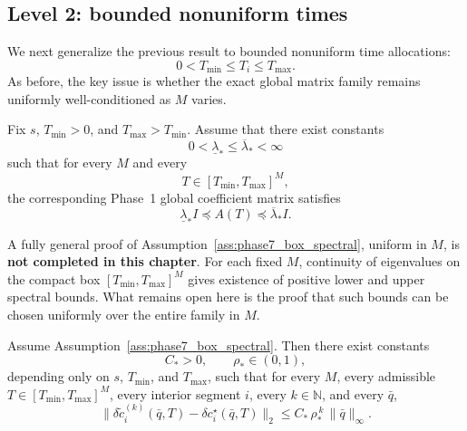 \subsection{Level 2: bounded nonuniform times}
\label{subsec:phase7_bounded_nonuniform}

We next generalize the previous result to bounded nonuniform time allocations:
\[
0<T_{\min}\le T_i\le T_{\max}.
\]
As before, the key issue is whether the exact global matrix family remains uniformly well-conditioned as \(M\) varies.

\begin{assumption}
	\label{ass:phase7_box_spectral}
	Fix \(s\), \(T_{\min}>0\), and \(T_{\max}>T_{\min}\).
	Assume that there exist constants
	\[
	0<\underline\lambda_\ast\le \overline\lambda_\ast<\infty
	\]
	such that for every \(M\) and every
	\[
	T\in[T_{\min},T_{\max}]^M,
	\]
	the corresponding Phase~1 global coefficient matrix satisfies
	\begin{equation}
		\label{eq:phase7_box_spectral}
		\underline\lambda_\ast I \preceq A(T) \preceq \overline\lambda_\ast I.
	\end{equation}
\end{assumption}

\begin{remark}
	\label{rem:phase7_box_spectral_limitation}
	A fully general proof of Assumption~\ref{ass:phase7_box_spectral}, uniform in \(M\), is \textbf{not completed in this chapter}.
	For each fixed \(M\), continuity of eigenvalues on the compact box \([T_{\min},T_{\max}]^M\) gives existence of positive lower and upper spectral bounds.
	What remains open here is the proof that such bounds can be chosen uniformly over the entire family in \(M\).
\end{remark}

\begin{theorem}
	\label{thm:phase7_box_error}
	Assume Assumption~\ref{ass:phase7_box_spectral}.
	Then there exist constants
	\[
	C_\ast>0,\qquad \rho_\ast\in(0,1),
	\]
	depending only on \(s\), \(T_{\min}\), and \(T_{\max}\), such that for every \(M\), every admissible \(T\in[T_{\min},T_{\max}]^M\), every interior segment \(i\), every \(k\in\mathbb N\), and every \(\bar q\),
	\begin{equation}
		\label{eq:phase7_box_error}
		\bigl\|
		\delta \tilde c_i^{(k)}(\bar q,T)-\delta c_i^\star(\bar q,T)
		\bigr\|_2
		\le
		C_\ast\,\rho_\ast^{\,k}\,\|\bar q\|_\infty.
	\end{equation}
\end{theorem}

